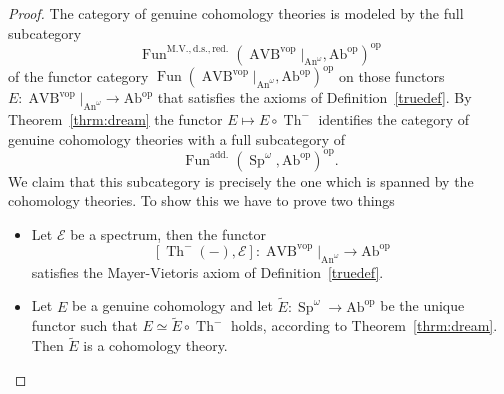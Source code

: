 \documentclass{article}
\newcommand{\Ab}{\mathrm{Ab}}
\newcommand{\op}{\mathrm{op}}
\newcommand{\vop}{\mathrm{vop}}
\DeclareMathOperator{\AVB}{AVB}
\DeclareMathOperator{\An}{An}
\DeclareMathOperator{\Sp}{Sp}
\DeclareMathOperator{\Fun}{Fun}
\DeclareMathOperator{\Th}{Th}
\begin{document}
\begin{proof}
    The category of genuine cohomology theories is modeled 
    by the full subcategory 
    \[
      \Fun^{\mathrm{M.V., d.s., red.}}(\AVB^\vop|_{\An^\omega}, \mathrm{Ab}^\op)^\op  
    \]
    of the functor category $\Fun(\AVB^\vop|_{\An^\omega}, \mathrm{Ab}^\op)^\op$ on those functors 
    $E \colon \AVB^\vop|_{\An^\omega} \to \mathrm{Ab}^\op$ that satisfies the axioms of Definition~\ref{truedef}.
    By Theorem~\ref{thrm:dream} the functor $E \mapsto E \circ \Th^-$ identifies the category of genuine cohomology 
    theories with a full subcategory of 
    \[
        \Fun^{\mathrm{add.}}(\Sp^\omega, \mathrm{Ab}^\op)^\op.
    \]
    We claim that this subcategory is precisely the one which is spanned by the cohomology theories.
    To show this we have to prove two things 
    \begin{itemize}
        \item Let $\mathcal E$ be a spectrum, then the functor 
            \[
                [\Th^-(-), \mathcal E] \colon \AVB^\vop|_{\An^\omega} \to \mathrm{Ab}^\op
            \]
            satisfies the Mayer-Vietoris axiom of Definition~\ref{truedef}.
        \item Let $E$ be a genuine cohomology and let $\tilde E \colon \Sp^\omega \to \Ab^\op$
              be the unique functor such that $E \simeq \tilde E \circ \Th^-$ holds, according to Theorem~\ref{thrm:dream}.
              Then $\tilde E$ is a cohomology theory.


\end{itemize}
\end{proof}
\end{document}
